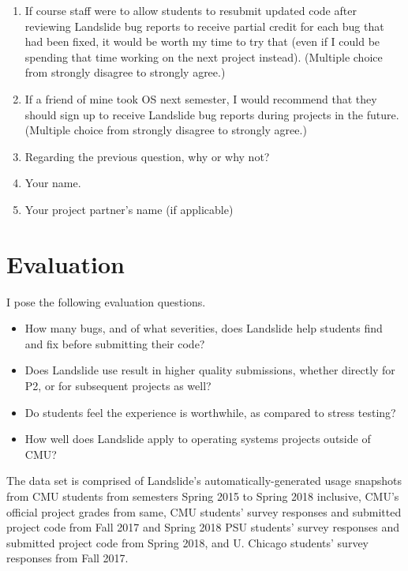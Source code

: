 \begin{enumerate}
	\item If course staff were to allow students to resubmit updated code after reviewing Landslide bug reports to receive partial credit for each bug that had been fixed, it would be worth my time to try that (even if I could be spending that time working on the next project instead).
		(Multiple choice from strongly disagree to strongly agree.)
	\item If a friend of mine took OS next semester, I would recommend that they should sign up to receive Landslide bug reports during projects in the future.
		(Multiple choice from strongly disagree to strongly agree.)
	\item Regarding the previous question, why or why not?
	\item Your name.
	\item Your project partner's name (if applicable)
\end{enumerate}


\section{Evaluation}

I pose the following evaluation questions.

\begin{itemize}
	\item How many bugs, and of what severities, does Landslide help students find and fix before submitting their code?
	\item Does Landslide use result in higher quality submissions, whether directly for P2, or for subsequent projects as well?
	\item Do students feel the experience is worthwhile, as compared to stress testing?
	\item How well does Landslide apply to operating systems projects outside of CMU?
\end{itemize}
\vspace{1em}

The data set is comprised of Landslide's automatically-generated usage snapshots
from CMU students from semesters Spring 2015 to Spring 2018 inclusive,
CMU's official project grades from same,
CMU students' survey responses and submitted project code from Fall 2017 and Spring 2018
PSU students' survey responses and submitted project code from Spring 2018,
and U. Chicago students' survey responses from Fall 2017.

